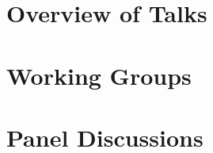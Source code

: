 \documentclass[a4paper,UKenglish]{dagrep}
\begin{document}
\tableofcontents


\section{Overview of Talks}




















\pagebreak
\section{Working Groups}












\section{Panel Discussions}





\end{document}
